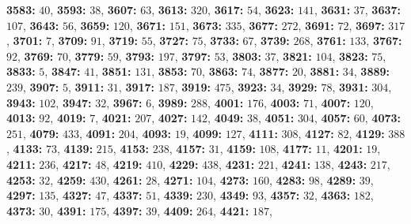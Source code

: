 \textsf{\bfseries 3583:} $40$, \textsf{\bfseries 3593:} $38$, \textsf{\bfseries 3607:} $63$, \textsf{\bfseries 3613:} $320$, \textsf{\bfseries 3617:} $54$, \textsf{\bfseries 3623:} $141$, \textsf{\bfseries 3631:} $37$, \textsf{\bfseries 3637:} $107$, \textsf{\bfseries 3643:} $56$, \textsf{\bfseries 3659:} $120$, \textsf{\bfseries 3671:} $151$, \textsf{\bfseries 3673:} $335$, \textsf{\bfseries 3677:} $272$, \textsf{\bfseries 3691:} $72$, \textsf{\bfseries 3697:} $317$, \textsf{\bfseries 3701:} $7$, \textsf{\bfseries 3709:} $91$, \textsf{\bfseries 3719:} $55$, \textsf{\bfseries 3727:} $75$, \textsf{\bfseries 3733:} $67$, \textsf{\bfseries 3739:} $268$, \textsf{\bfseries 3761:} $133$, \textsf{\bfseries 3767:} $92$, \textsf{\bfseries 3769:} $70$, \textsf{\bfseries 3779:} $59$, \textsf{\bfseries 3793:} $197$, \textsf{\bfseries 3797:} $53$, \textsf{\bfseries 3803:} $37$, \textsf{\bfseries 3821:} $104$, \textsf{\bfseries 3823:} $75$, \textsf{\bfseries 3833:} $5$, \textsf{\bfseries 3847:} $41$, \textsf{\bfseries 3851:} $131$, \textsf{\bfseries 3853:} $70$, \textsf{\bfseries 3863:} $74$, \textsf{\bfseries 3877:} $20$, \textsf{\bfseries 3881:} $34$, \textsf{\bfseries 3889:} $239$, \textsf{\bfseries 3907:} $5$, \textsf{\bfseries 3911:} $31$, \textsf{\bfseries 3917:} $187$, \textsf{\bfseries 3919:} $475$, \textsf{\bfseries 3923:} $34$, \textsf{\bfseries 3929:} $78$, \textsf{\bfseries 3931:} $304$, \textsf{\bfseries 3943:} $102$, \textsf{\bfseries 3947:} $32$, \textsf{\bfseries 3967:} $6$, \textsf{\bfseries 3989:} $288$, \textsf{\bfseries 4001:} $176$, \textsf{\bfseries 4003:} $71$, \textsf{\bfseries 4007:} $120$, \textsf{\bfseries 4013:} $92$, \textsf{\bfseries 4019:} $7$, \textsf{\bfseries 4021:} $207$, \textsf{\bfseries 4027:} $142$, \textsf{\bfseries 4049:} $38$, \textsf{\bfseries 4051:} $304$, \textsf{\bfseries 4057:} $60$, \textsf{\bfseries 4073:} $251$, \textsf{\bfseries 4079:} $433$, \textsf{\bfseries 4091:} $204$, \textsf{\bfseries 4093:} $19$, \textsf{\bfseries 4099:} $127$, \textsf{\bfseries 4111:} $308$, \textsf{\bfseries 4127:} $82$, \textsf{\bfseries 4129:} $388$, \textsf{\bfseries 4133:} $73$, \textsf{\bfseries 4139:} $215$, \textsf{\bfseries 4153:} $238$, \textsf{\bfseries 4157:} $31$, \textsf{\bfseries 4159:} $108$, \textsf{\bfseries 4177:} $11$, \textsf{\bfseries 4201:} $19$, \textsf{\bfseries 4211:} $236$, \textsf{\bfseries 4217:} $48$, \textsf{\bfseries 4219:} $410$, \textsf{\bfseries 4229:} $438$, \textsf{\bfseries 4231:} $221$, \textsf{\bfseries 4241:} $138$, \textsf{\bfseries 4243:} $217$, \textsf{\bfseries 4253:} $32$, \textsf{\bfseries 4259:} $430$, \textsf{\bfseries 4261:} $28$, \textsf{\bfseries 4271:} $104$, \textsf{\bfseries 4273:} $160$, \textsf{\bfseries 4283:} $98$, \textsf{\bfseries 4289:} $39$, \textsf{\bfseries 4297:} $135$, \textsf{\bfseries 4327:} $47$, \textsf{\bfseries 4337:} $51$, \textsf{\bfseries 4339:} $230$, \textsf{\bfseries 4349:} $93$, \textsf{\bfseries 4357:} $32$, \textsf{\bfseries 4363:} $182$, \textsf{\bfseries 4373:} $30$, \textsf{\bfseries 4391:} $175$, \textsf{\bfseries 4397:} $39$, \textsf{\bfseries 4409:} $264$, \textsf{\bfseries 4421:} $187$, 
